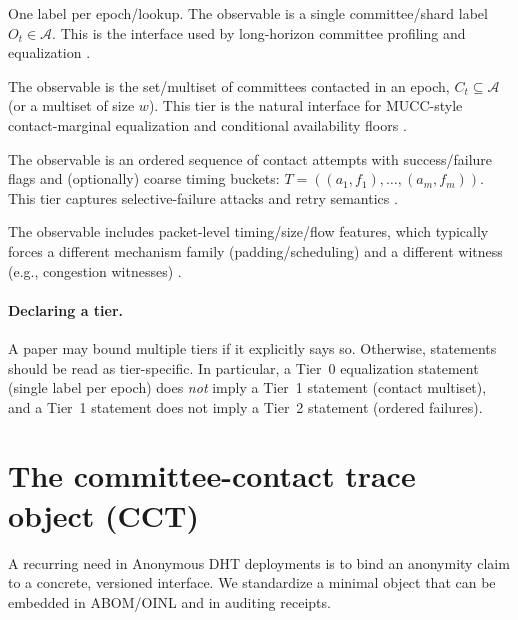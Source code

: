 \documentclass[11pt]{article}
\begin{document}
\begin{description}[leftmargin=*]
\item[Tier 0: destination label.] One label per epoch/lookup.
The observable is a single committee/shard label $O_t\in\mathcal{A}$.
This is the interface used by long-horizon committee profiling and equalization \cite{series:profiling}.

\item[Tier 1: contact set or multiset.] The observable is the set/multiset of committees contacted in an epoch,
$C_t\subseteq \mathcal{A}$ (or a multiset of size $w$).
This tier is the natural interface for MUCC-style contact-marginal equalization and conditional availability floors \cite{series:state2}.

\item[Tier 2: ordered trace with failures.] The observable is an ordered sequence of contact attempts with success/failure flags and (optionally) coarse timing buckets:
$T = ((a_1,f_1),\ldots,(a_m,f_m))$.
This tier captures selective-failure attacks and retry semantics \cite{WangMittalBorisovCCS2010}.

\item[Tier 3: packet/flow metadata.] The observable includes packet-level timing/size/flow features, which typically forces a different mechanism family (padding/scheduling) and a different witness (e.g., congestion witnesses) \cite{series:schedcompiler,series:congeq}.
\end{description}

\paragraph{Declaring a tier.}
A paper may bound multiple tiers if it explicitly says so.
Otherwise, statements should be read as tier-specific.
In particular, a Tier~0 equalization statement (single label per epoch) does \emph{not} imply a Tier~1 statement (contact multiset), and a Tier~1 statement does not imply a Tier~2 statement (ordered failures).

\section{The committee-contact trace object (CCT)}\label{sec:cct}
A recurring need in Anonymous DHT deployments is to bind an anonymity claim to a concrete, versioned interface.
We standardize a minimal object that can be embedded in ABOM/OINL and in auditing receipts.
\end{document}
